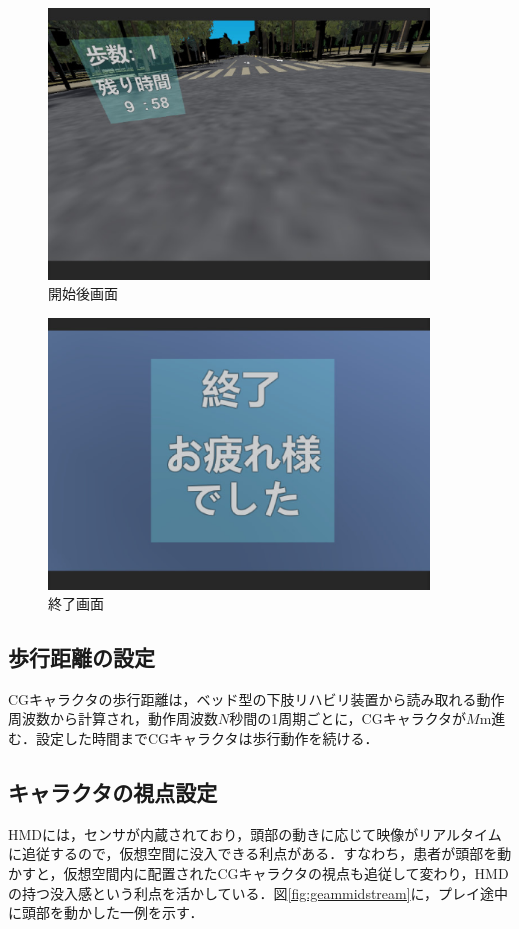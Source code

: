 \begin{figure}[tbp]
	\centering
			\includegraphics[width=0.9\textwidth]{chap2-figure/midstream-1.eps}
	\caption{開始後画面}
	\label{fig:gemestart}
\end{figure}

\begin{figure}[tbp]
	\centering
			\includegraphics[width=0.9\textwidth]{chap2-figure/end.eps}
	\caption{終了画面}
	\label{fig:end}
\end{figure}
\fi

\subsection{歩行距離の設定}
CGキャラクタの歩行距離は，ベッド型の下肢リハビリ装置から読み取れる動作周波数から計算され，動作周波数$N$秒間の1周期ごとに，CGキャラクタが$M$m進む．設定した時間までCGキャラクタは歩行動作を続ける．

\subsection{キャラクタの視点設定}
HMDには，センサが内蔵されており，頭部の動きに応じて映像がリアルタイムに追従するので，仮想空間に没入できる利点がある．すなわち，患者が頭部を動かすと，仮想空間内に配置されたCGキャラクタの視点も追従して変わり，HMDの持つ没入感という利点を活かしている．図\ref{fig:geammidstream}に，プレイ途中に頭部を動かした一例を示す．


